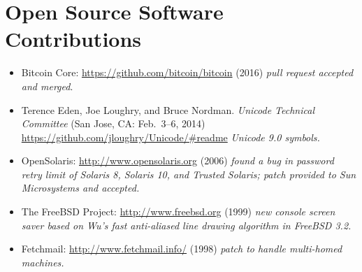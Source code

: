\section*{Open Source Software Contributions}
\vspace{-3mm}

\begin{itemize}
    \item Bitcoin Core: \url{https://github.com/bitcoin/bitcoin} (2016)
        \emph{pull request accepted and merged}.\vspace{-2.5mm}
	\item Terence Eden, Joe Loughry, and Bruce Nordman. \emph{Unicode
		Technical Committee} (San Jose, CA: Feb.\ 3--6, 2014)
		\url{https://github.com/jloughry/Unicode/#readme}
    \emph{Unicode 9.0 symbols.}\vspace{-2.5mm}
	\item OpenSolaris: \url{http://www.opensolaris.org} (2006)
		\emph{found a bug in password retry limit of Solaris 8, Solaris 10,
		and Trusted Solaris; patch provided to Sun Microsystems and
    accepted.}\vspace{-2.5mm}
	\item The FreeBSD Project: \url{http://www.freebsd.org} (1999)
		\emph{new console screen saver based on Wu's fast
		anti-aliased line drawing algorithm in FreeBSD 3.2.}\vspace{-2.5mm}
	\item Fetchmail: \url{http://www.fetchmail.info/} (1998)
		\emph{patch to handle multi-homed machines.}
\end{itemize}

